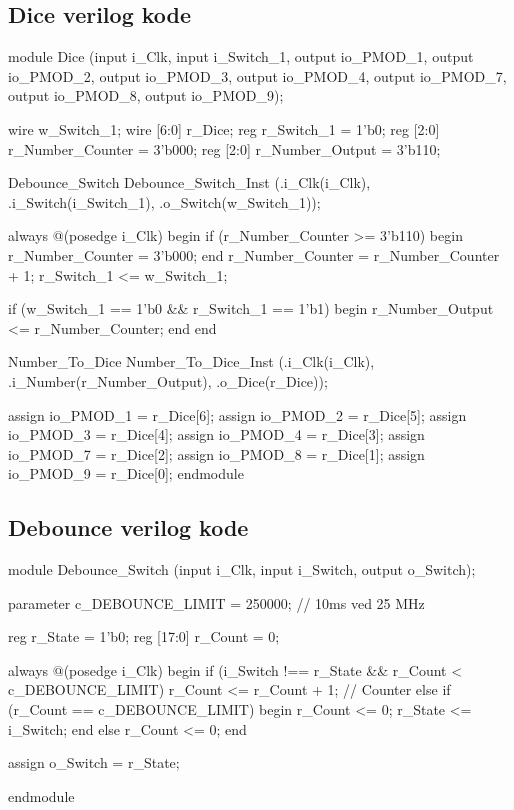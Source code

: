 \subsection{Dice verilog kode}
\begin{verilogcode}
module Dice
    (input i_Clk, input i_Switch_1,
     output io_PMOD_1, output io_PMOD_2,
     output io_PMOD_3, output io_PMOD_4,
     output io_PMOD_7, output io_PMOD_8,
     output io_PMOD_9);

 wire w_Switch_1;
 wire [6:0] r_Dice;
 reg  r_Switch_1 = 1'b0;
 reg [2:0] r_Number_Counter = 3'b000;
 reg [2:0] r_Number_Output = 3'b110;

 Debounce_Switch Debounce_Switch_Inst
    (.i_Clk(i_Clk),
     .i_Switch(i_Switch_1),
     .o_Switch(w_Switch_1));

 always @(posedge i_Clk) begin
     if (r_Number_Counter >= 3'b110) begin
         r_Number_Counter = 3'b000;
     end
     r_Number_Counter = r_Number_Counter + 1;
     r_Switch_1 <= w_Switch_1;
     
     if (w_Switch_1 == 1'b0 && r_Switch_1 == 1'b1) begin
         r_Number_Output <= r_Number_Counter;
     end
 end

 Number_To_Dice Number_To_Dice_Inst
    (.i_Clk(i_Clk),
     .i_Number(r_Number_Output),
     .o_Dice(r_Dice));

 assign io_PMOD_1 = r_Dice[6];
 assign io_PMOD_2 = r_Dice[5];
 assign io_PMOD_3 = r_Dice[4];
 assign io_PMOD_4 = r_Dice[3];
 assign io_PMOD_7 = r_Dice[2];
 assign io_PMOD_8 = r_Dice[1];
 assign io_PMOD_9 = r_Dice[0];
endmodule  
\end{verilogcode}

\subsection{Debounce verilog kode}
\begin{verilogcode}
module Debounce_Switch
    (input i_Clk,
     input i_Switch,
     output o_Switch);

 parameter c_DEBOUNCE_LIMIT = 250000; // 10ms ved 25 MHz

 reg        r_State = 1'b0;
 reg [17:0] r_Count = 0;

 always @(posedge i_Clk)
 begin
    if (i_Switch !== r_State && r_Count < c_DEBOUNCE_LIMIT)
         r_Count <= r_Count + 1; // Counter
    else if (r_Count == c_DEBOUNCE_LIMIT)
    begin
        r_Count <= 0;
        r_State <= i_Switch;
    end
    else
        r_Count <= 0;
 end

 assign o_Switch = r_State;

endmodule
\end{verilogcode}

